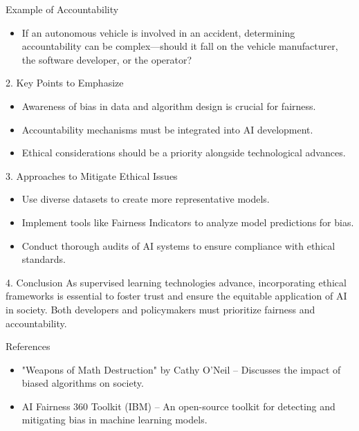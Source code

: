 \documentclass[aspectratio=169]{beamer}
\begin{document}
\begin{frame}[fragile]{Example of Accountability}
    \begin{itemize}
        \item If an autonomous vehicle is involved in an accident, determining accountability can be complex—should it fall on the vehicle manufacturer, the software developer, or the operator?
    \end{itemize}
\end{frame}

\begin{frame}[fragile]{2. Key Points to Emphasize}
    \begin{itemize}
        \item Awareness of bias in data and algorithm design is crucial for fairness.
        \item Accountability mechanisms must be integrated into AI development.
        \item Ethical considerations should be a priority alongside technological advances.
    \end{itemize}
\end{frame}

\begin{frame}[fragile]{3. Approaches to Mitigate Ethical Issues}
    \begin{itemize}
        \item Use diverse datasets to create more representative models.
        \item Implement tools like Fairness Indicators to analyze model predictions for bias.
        \item Conduct thorough audits of AI systems to ensure compliance with ethical standards.
    \end{itemize}
\end{frame}

\begin{frame}[fragile]{4. Conclusion}
    As supervised learning technologies advance, incorporating ethical frameworks is essential to foster trust and ensure the equitable application of AI in society. Both developers and policymakers must prioritize fairness and accountability.
\end{frame}

\begin{frame}[fragile]{References}
    \begin{itemize}
        \item "Weapons of Math Destruction" by Cathy O'Neil – Discusses the impact of biased algorithms on society.
        \item AI Fairness 360 Toolkit (IBM) – An open-source toolkit for detecting and mitigating bias in machine learning models.
    \end{itemize}
\end{frame}
\end{document}
